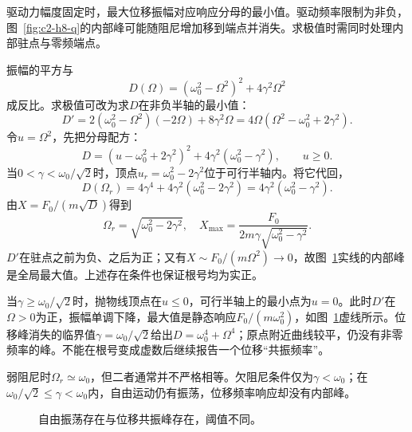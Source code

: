 \begin{solution}
驱动力幅度固定时，最大位移振幅对应响应分母的最小值。驱动频率限制为非负，图~\ref{fig:c2-h8-q}的内部峰可能随阻尼增加移到端点并消失。求极值时需同时处理内部驻点与零频端点。


振幅的平方与
\[D(\Omega)=(\omega_0^2-\Omega^2)^2+4\gamma^2\Omega^2\]
成反比。求极值可改为求$D$在非负半轴的最小值：
\[D'=2(\omega_0^2-\Omega^2)(-2\Omega)+8\gamma^2\Omega
=4\Omega(\Omega^2-\omega_0^2+2\gamma^2).\]
令$u=\Omega^2$，先把分母配方：
\[D=(u-\omega_0^2+2\gamma^2)^2+4\gamma^2(\omega_0^2-\gamma^2),\qquad u\ge0.\]
当$0<\gamma<\omega_0/\sqrt2$时，顶点$u_r=\omega_0^2-2\gamma^2$位于可行半轴内。将它代回，
\[D(\Omega_r)=4\gamma^4+4\gamma^2(\omega_0^2-2\gamma^2)
=4\gamma^2(\omega_0^2-\gamma^2).\]
由$X=F_0/(m\sqrt D)$得到
\[\boxed{\Omega_r=\sqrt{\omega_0^2-2\gamma^2},\quad
 X_{\max}=\frac{F_0}{2m\gamma\sqrt{\omega_0^2-\gamma^2}}}.\]
$D'$在驻点之前为负、之后为正；又有$X\sim F_0/(m\Omega^2)\to0$，故图~\ref{fig:c2-h8-s}实线的内部峰是全局最大值。上述存在条件也保证根号均为实正。

当$\gamma\ge\omega_0/\sqrt2$时，抛物线顶点在$u\le0$，可行半轴上的最小点为$u=0$。此时$D'$在$\Omega>0$为正，振幅单调下降，最大值是静态响应$F_0/(m\omega_0^2)$，如图~\ref{fig:c2-h8-s}虚线所示。位移峰消失的临界值$\gamma=\omega_0/\sqrt2$给出$D=\omega_0^4+\Omega^4$；原点附近曲线较平，仍没有非零频率的峰。不能在根号变成虚数后继续报告一个位移“共振频率”。

弱阻尼时$\Omega_r\simeq\omega_0$，但二者通常并不严格相等。欠阻尼条件仅为$\gamma<\omega_0$；在$\omega_0/\sqrt2\le\gamma<\omega_0$内，自由运动仍有振荡，位移频率响应却没有内部峰。

\begin{figure}[H]\centering
{}
\caption{自由振荡存在与位移共振峰存在，阈值不同。}\label{fig:c2-h8-s}
\end{figure}
\end{solution}

